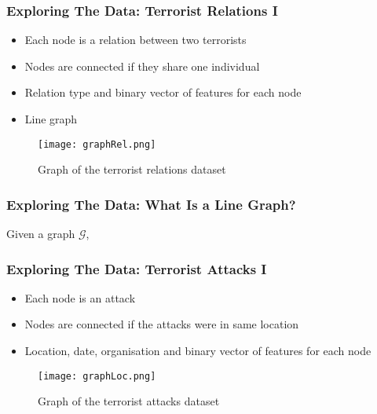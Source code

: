 \begin{frame}
\frametitle{Exploring The Data: Terrorist Relations I}
	
	\begin{itemize}
		\item  Each node is a relation between two terrorists
		\item  Nodes are connected if they share one individual
		\item  Relation type and binary vector of features for each node
		\item  Line graph
	\end{itemize}
	
	\begin{figure}
		\begin{center}
			\texttt{[image: graphRel.png]}
			\caption{Graph of the terrorist relations dataset}
			\label{fig:graph relations}
		\end{center}
	\end{figure}
	
\end{frame}

\begin{frame}
\frametitle{Exploring The Data: What Is a Line Graph?}

\begin{definition}
	Given a graph $\mathcal{G}$, 
\end{definition}
\end{frame}

\begin{frame}
\frametitle{Exploring The Data: Terrorist Attacks I}
	
	\begin{itemize}
		\item Each node is an attack
		\item Nodes are connected if the attacks were in same location
		\item Location, date, organisation and binary vector of features for each node
	\end{itemize}
	
	\begin{figure}
		\begin{center}
			\texttt{[image: graphLoc.png]}
			\caption{Graph of the terrorist attacks dataset}
			\label{fig:graph relations}
		\end{center}
	\end{figure}
\end{frame}

